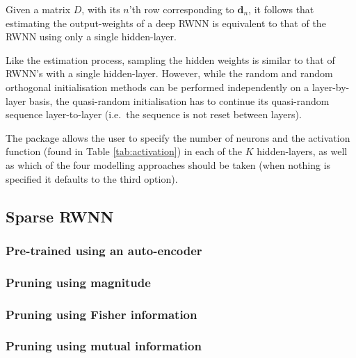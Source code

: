 \documentclass[
]{jss}
\begin{document}
Given a matrix \(D\), with its \(n\)'th row corresponding to
\(\boldsymbol{d}_n\), it follows that estimating the output-weights of a
deep RWNN is equivalent to that of the RWNN using only a single
hidden-layer.

Like the estimation process, sampling the hidden weights is similar to
that of RWNN's with a single hidden-layer. However, while the random and
random orthogonal initialisation methods can be performed independently
on a layer-by-layer basis, the quasi-random initialisation has to
continue its quasi-random sequence layer-to-layer (i.e.~the sequence is
not reset between layers).

The  package allows the user to specify the number of neurons
and the activation function (found in Table \ref{tab:activation}) in
each of the \(K\) hidden-layers, as well as which of the four modelling
approaches should be taken (when nothing is specified it defaults to the
third option).

\hypertarget{sparse-rwnn}{%
\subsection{Sparse RWNN}\label{sparse-rwnn}}

\hypertarget{pre-trained-using-an-auto-encoder}{%
\subsubsection{Pre-trained using an
auto-encoder}\label{pre-trained-using-an-auto-encoder}}

\hypertarget{pruning-using-magnitude}{%
\subsubsection{Pruning using magnitude}\label{pruning-using-magnitude}}

\hypertarget{pruning-using-fisher-information}{%
\subsubsection{Pruning using Fisher
information}\label{pruning-using-fisher-information}}

\hypertarget{pruning-using-mutual-information}{%
\subsubsection{Pruning using mutual
information}\label{pruning-using-mutual-information}}
\end{document}
